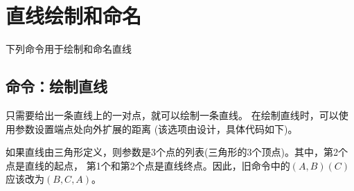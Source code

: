 \documentclass[../main.tex]{subfiles}
\begin{document}
\section{直线绘制和命名}

下列命令用于绘制和命名直线

\subsection{命令：绘制直线}

只需要给出一条直线上的一对点，就可以绘制一条直线。
在绘制直线时，可以使用参数设置端点处向外扩展的距离
(该选项由设计，具体代码如下)。

\begin{tkzltxexample}[small]
\end{tkzltxexample}

如果直线由三角形定义，则参数是3个点的列表(三角形的3个顶点)。其中，第2个点是直线的起点，
第1个和第2个点是直线终点。因此，旧命令中的$(A,B)(C)$应该改为$(B,C,A)$。
\end{document}
